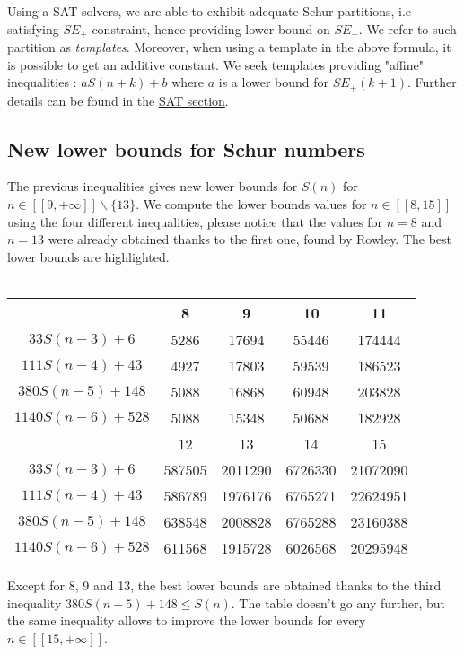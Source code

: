 Using a SAT solvers, we are able to exhibit adequate Schur partitions, i.e satisfying \(SE_+\) constraint, 
hence providing lower bound on \(SE_+\). We refer to such partition as \textit{templates}. Moreover, when using 
a template in the above formula, it is possible to get an additive constant. We seek templates providing "affine"
inequalities : \(aS(n+k) + b \) where \(a\) is a lower bound for \(SE_+(k+1)\). Further details can be found in the \hyperref[SAT]{SAT section}.

\subsection{New lower bounds for Schur numbers}

The previous inequalities gives new lower bounds for \(S(n)\) for
\( n \in [\![9,+\infty]\!] \backslash \{13\} \). We compute the lower
bounds values for \( n \in [\![8,15]\!] \) using the four different inequalities, please notice that the values for \( n = 8\) and \(n = 13\) were already obtained thanks to the first one, found by Rowley. The best lower bounds are highlighted.\\
\\
\begin{center}
\begin{tabular}{|*{5}{c|}}
    \hline
	 & 8 & 9 & 10 & 11 \\
	\hline
	\(33S(n-3) + 6 \) & \cellcolor{yellow} 5286 & 17694 & 55446 & 174444\\
	\hline
	\(111S(n-4) + 43 \) & 4927 & \cellcolor{yellow} 17803 & 59539 & 186523\\
	\hline
	\(380S(n-5) + 148 \) & 5088 & 16868 & \cellcolor{yellow} 60948 & \cellcolor{yellow} 203828 \\
	\hline
	\(1140S(n-6) + 528 \) & 5088 & 15348 & 50688 & 182928\\
	\hline
	\hline
	& 12 & 13 & 14 & 15 \\
	\hline
	\(33S(n-3) + 6 \) & 587505 & \cellcolor{yellow} 2011290 & 6726330 & 21072090\\
	\hline
	\(111S(n-4) + 43 \) & 586789 & 1976176 & 6765271 & 22624951 \\
	\hline
	\(380S(n-5) + 148 \) & \cellcolor{yellow} 638548 & 2008828 & \cellcolor{yellow} 6765288 & \cellcolor{yellow} 23160388 \\
	\hline
	\(1140S(n-6) + 528 \) & 611568 & 1915728 & 6026568 & 20295948 \\
	\hline
\end{tabular}
\end{center}
Except for 8, 9 and 13, the best lower bounds are obtained thanks to the third inequality \( 380S(n-5) + 148 \leqslant S(n) \). The table doesn't go any further, but the same inequality allows to improve the lower bounds for every \( n \in [\![15,+\infty]\!] \).